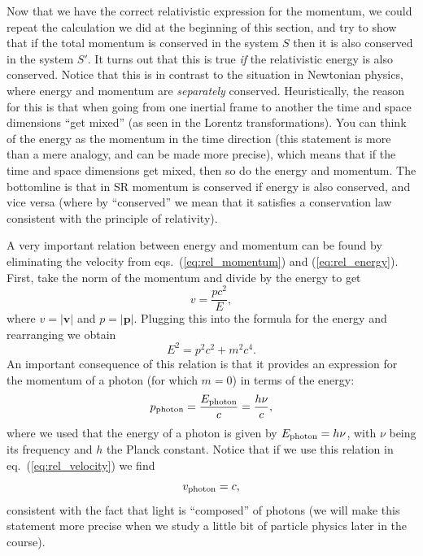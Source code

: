 Now that we have the correct relativistic expression for the momentum, we could repeat the calculation we did at the beginning of this section, and try to show that if the total momentum is conserved in the system $S$ then it is also conserved in the system $S'$. It turns out that this is true {\it if} the relativistic energy is also conserved. Notice that this is in contrast to the situation in Newtonian physics, where energy and momentum are {\it separately} conserved. Heuristically, the reason for this is that when going from one inertial frame to another the time and space dimensions ``get mixed'' (as seen in the Lorentz transformations). You can think of the energy as the momentum in the time direction (this statement is more than a mere analogy, and can be made more precise), which means that if the time and space dimensions get mixed, then so do the energy and momentum. The bottomline is that in SR momentum is conserved if energy is also conserved, and vice versa (where by ``conserved'' we mean that 
it satisfies a conservation law consistent with the principle of relativity).

A very important relation between energy and momentum can be found by eliminating the velocity from eqs.\ (\ref{eq:rel_momentum}) and (\ref{eq:rel_energy}). First, take the norm of the momentum and divide by the energy to get
\begin{equation} \label{eq:rel_velocity}
v=\frac{pc^2}{E},
\end{equation}
where $v=|\mathbf{v}|$ and $p=|\mathbf{p}|$. Plugging this into the formula for the energy and rearranging we obtain
\begin{equation}
E^2=p^2c^2+m^2c^4.
\end{equation}
An important consequence of this relation is that it provides an expression for the momentum of a photon (for which $m=0$) in terms of the energy:
\begin{equation}
p_{\rm photon}=\frac{E_{\rm photon}}{c}=\frac{h\nu}{c},
\end{equation}
where we used that the energy of a photon is given by $E_{\rm photon}=h\nu$, with $\nu$ being its frequency and $h$ the Planck constant. Notice that if we use this relation in eq.\ (\ref{eq:rel_velocity}) we find
\begin{equation}
v_{\rm photon}=c,
\end{equation}
consistent with the fact that light is ``composed'' of photons (we will make this statement more precise when we study a little bit of particle physics later in the course).


